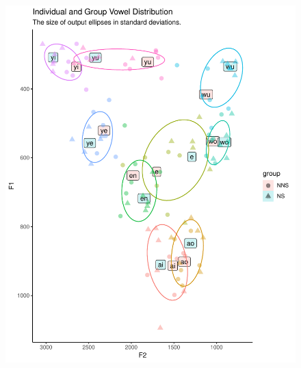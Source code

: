 \documentclass[man, fleqn, noextraspace]{apa6}
\begin{document}
\begin{figure}
\centering
\includegraphics{Vowel_v2_files/figure-latex/figure3-1.pdf}
\caption{}
\end{figure}
\end{document}
